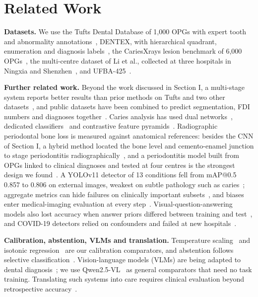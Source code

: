 \documentclass[conference]{IEEEtran}
\begin{document}
\section{Related Work}

\textbf{Datasets.} We use the Tufts Dental Database of 1,000 OPGs with expert tooth and abnormality annotations~\cite{panetta2022tufts}, DENTEX, with hierarchical quadrant, enumeration and diagnosis labels~\cite{hamamci2023dentex}, the CariesXrays lesion benchmark of 6,000 OPGs~\cite{chen2024cariesxrays}, the multi-centre dataset of Li et al., collected at three hospitals in Ningxia and Shenzhen~\cite{li2024multicenter}, and UFBA-425~\cite{budagam2024oralbbnet}.

\textbf{Further related work.} Beyond the work discussed in Section I, a multi-stage system reports better results than prior methods on Tufts and two other datasets~\cite{zhang2025reliable}, and public datasets have been combined to predict segmentation, FDI numbers and diagnoses together~\cite{vannistelrooij2024combining}. Caries analysis has used dual networks~\cite{lim2024dual}, dedicated classifiers~\cite{bilal2024pdcnet} and contrastive feature pyramids~\cite{chen2024cariesxrays}. Radiographic periodontal bone loss is measured against anatomical references: besides the CNN of Section I, a hybrid method located the bone level and cemento-enamel junction to stage periodontitis radiographically~\cite{chang2020deep}, and a periodontitis model built from OPGs linked to clinical diagnoses and tested at four centres is the strongest design we found~\cite{li2025novel}. A YOLOv11 detector of 13 conditions fell from mAP@0.5 0.857 to 0.806 on external images, weakest on subtle pathology such as caries~\cite{mutlu2026comparison}; aggregate metrics can hide failures on clinically important subsets~\cite{oakdenrayner2020hidden}, and biases enter medical-imaging evaluation at every step~\cite{varoquaux2022machine}. Visual-question-answering models also lost accuracy when answer priors differed between training and test~\cite{agrawal2018dont}, and COVID-19 detectors relied on confounders and failed at new hospitals~\cite{degrave2021ai}.

\textbf{Calibration, abstention, VLMs and translation.} Temperature scaling~\cite{guo2017calibration} and isotonic regression~\cite{zadrozny2002isotonic} are our calibration comparators, and abstention follows selective classification~\cite{geifman2017selective}. Vision-language models (VLMs) are being adapted to dental diagnosis~\cite{meng2026dentvlm}; we use Qwen2.5-VL~\cite{bai2025qwen25vl} as general comparators that need no task training. Translating such systems into care requires clinical evaluation beyond retrospective accuracy~\cite{kelly2019key,schwendicke2020artificial}.
\end{document}
